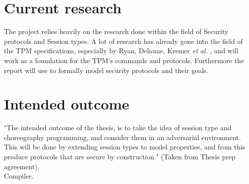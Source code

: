 
\section{Current research}
The project relies heavily on the research done within the field of Security protocols and Session types. A lot of research has already gone into the field of the TPM specifications, especially by Ryan, Delaune, Kremer \textit{et al.} \autocite{DBLP:conf/ifip1-7/DelauneKRS10}, and will work as a foundation for the TPM's commands and protocols. Furthermore the report will use \citeauthor{DBLP:journals/ftpl/CortierK14,} to formally model security protocols and their goals.

\section{Intended outcome}
"The intended outcome of the thesis, is to take the idea of session type and choreography programming, and consider them in an adversarial environment. This will be done by extending session types to model properties, and
from this produce protocols that are secure by construction." (Taken from Thesis prep agreement). \\
Compiler.